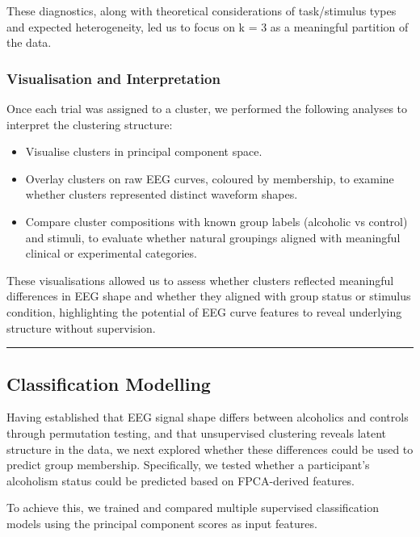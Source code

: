 \documentclass{article}
\begin{document}
These diagnostics, along with theoretical considerations of
task/stimulus types and expected heterogeneity, led us to focus on k = 3
as a meaningful partition of the data.

\subsubsection{Visualisation and
Interpretation}\label{visualisation-and-interpretation}

Once each trial was assigned to a cluster, we performed the following
analyses to interpret the clustering structure:

\begin{itemize}
\item
  Visualise clusters in principal component space.
\item
  Overlay clusters on raw EEG curves, coloured by membership, to examine
  whether clusters represented distinct waveform shapes.
\item
  Compare cluster compositions with known group labels (alcoholic vs
  control) and stimuli, to evaluate whether natural groupings aligned
  with meaningful clinical or experimental categories.
\end{itemize}

These visualisations allowed us to assess whether clusters reflected
meaningful differences in EEG shape and whether they aligned with group
status or stimulus condition, highlighting the potential of EEG curve
features to reveal underlying structure without supervision.

\begin{center}\rule{0.5\linewidth}{0.5pt}\end{center}

\subsection{Classification Modelling}\label{classification-modelling}

Having established that EEG signal shape differs between alcoholics and
controls through permutation testing, and that unsupervised clustering
reveals latent structure in the data, we next explored whether these
differences could be used to predict group membership. Specifically, we
tested whether a participant's alcoholism status could be predicted
based on FPCA-derived features.

To achieve this, we trained and compared multiple supervised
classification models using the principal component scores as input
features.
\end{document}
